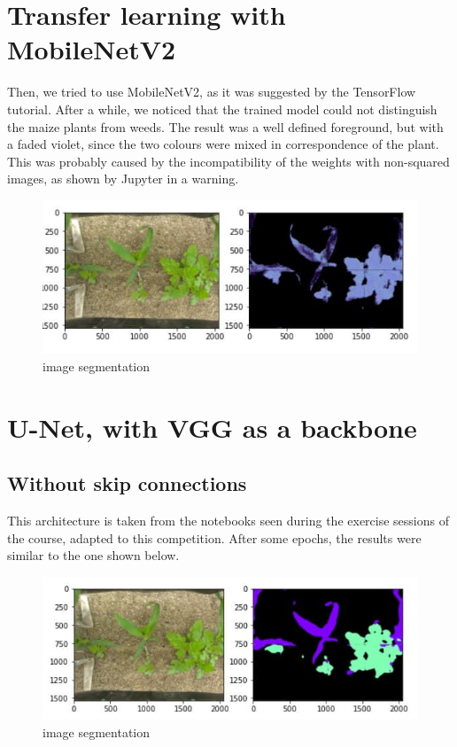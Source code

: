 \documentclass[12pt,a4paper]{report}
\begin{document}
		\section{Transfer learning with MobileNetV2}
Then, we tried to use MobileNetV2, as it was suggested by the TensorFlow tutorial. After a while, we noticed that the trained model could not distinguish the maize plants from weeds. The result was a well defined foreground, but with a faded violet, since the two colours were mixed in correspondence of the plant.  This was probably caused by the incompatibility of the weights with non-squared images, as shown by Jupyter in a warning. 
	

\begin{figure}[H]
	\includegraphics[scale = 1.2, center]{MobileNetV2}
	\caption{image segmentation}
\end{figure}

		\section{U-Net, with VGG as a backbone}
	\subsection{Without skip connections}
This architecture is taken from the notebooks seen during the exercise sessions of the course, adapted to this competition.
After some epochs, the results were similar to the one shown below.

\begin{figure}[H]
	\includegraphics[scale = .75, center]{vgg_upsampling_without}
	\caption{image segmentation}
\end{figure}
\end{document}
